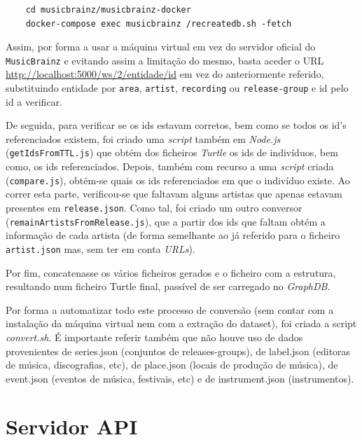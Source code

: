 \documentclass{article}
\begin{document}
\begin{framed}
\begin{verbatim}
    cd musicbrainz/musicbrainz-docker
    docker-compose exec musicbrainz /recreatedb.sh -fetch
\end{verbatim}
\end{framed}

Assim, por forma a usar a máquina virtual em vez do servidor oficial do \texttt{MusicBrainz} e evitando assim a limitação do mesmo, basta aceder o URL \url{http://localhost:5000/ws/2/entidade/id} em vez do anteriormente referido, substituindo entidade por \texttt{area}, \texttt{artist}, \texttt{recording} ou \texttt{release-group} e id pelo id a verificar.

De seguida, para verificar se os ids estavam corretos, bem como se todos os id's referenciados existem, foi criado uma \textit{script} também em \textit{Node.js} (\texttt{getIdsFromTTL.js}) que obtém dos ficheiros \textit{Turtle} os ids de indivíduos, bem como, os ids referenciados. Depois, também com recurso a uma \textit{script} criada (\texttt{compare.js}), obtém-se quais os ids referenciados em que o indivíduo existe. Ao correr esta parte, verificou-se que faltavam alguns artistas que apenas estavam presentes em \texttt{release.json}. Como tal, foi criado um outro conversor (\texttt{remainArtistsFromRelease.js}), que a partir dos ids que faltam obtém a informação de cada artista (de forma semelhante ao já referido para o ficheiro \texttt{artist.json} mas, sem ter em conta \textit{URLs}).

Por fim, concatenasse os vários ficheiros gerados e o ficheiro com a estrutura, resultando num ficheiro Turtle final, passível de ser carregado no \textit{GraphDB}.

Por forma a automatizar todo este processo de conversão (sem contar com a instalação da máquina virtual nem com a extração do dataset), foi criada a script \textit{convert.sh}. É importante referir também que não houve uso de dados provenientes de series.json (conjuntos de releases-groups), de label.json (editoras de música, discografias, etc), de place.json (locais de produção de música), de event.json (eventos de música, festivais, etc) e de instrument.json (instrumentos).

\section{Servidor API}
\end{document}
